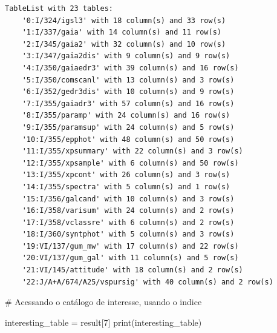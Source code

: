 \documentclass[
  letterpaper,
  DIV=11,
  numbers=noendperiod]{scrreprt}
\newenvironment{Shaded}{\begin{snugshade}}{\end{snugshade}}
\newcommand{\BuiltInTok}[1]{\textcolor[rgb]{0.00,0.23,0.31}{#1}}
\newcommand{\CommentTok}[1]{\textcolor[rgb]{0.37,0.37,0.37}{#1}}
\newcommand{\DecValTok}[1]{\textcolor[rgb]{0.68,0.00,0.00}{#1}}
\newcommand{\NormalTok}[1]{\textcolor[rgb]{0.00,0.23,0.31}{#1}}
\newcommand{\OperatorTok}[1]{\textcolor[rgb]{0.37,0.37,0.37}{#1}}
\begin{document}
\begin{verbatim}
TableList with 23 tables:
    '0:I/324/igsl3' with 18 column(s) and 33 row(s) 
    '1:I/337/gaia' with 14 column(s) and 11 row(s) 
    '2:I/345/gaia2' with 32 column(s) and 10 row(s) 
    '3:I/347/gaia2dis' with 9 column(s) and 9 row(s) 
    '4:I/350/gaiaedr3' with 39 column(s) and 16 row(s) 
    '5:I/350/comscanl' with 13 column(s) and 3 row(s) 
    '6:I/352/gedr3dis' with 10 column(s) and 9 row(s) 
    '7:I/355/gaiadr3' with 57 column(s) and 16 row(s) 
    '8:I/355/paramp' with 24 column(s) and 16 row(s) 
    '9:I/355/paramsup' with 24 column(s) and 5 row(s) 
    '10:I/355/epphot' with 48 column(s) and 50 row(s) 
    '11:I/355/xpsummary' with 22 column(s) and 3 row(s) 
    '12:I/355/xpsample' with 6 column(s) and 50 row(s) 
    '13:I/355/xpcont' with 26 column(s) and 3 row(s) 
    '14:I/355/spectra' with 5 column(s) and 1 row(s) 
    '15:I/356/galcand' with 10 column(s) and 3 row(s) 
    '16:I/358/varisum' with 24 column(s) and 2 row(s) 
    '17:I/358/vclassre' with 6 column(s) and 2 row(s) 
    '18:I/360/syntphot' with 5 column(s) and 3 row(s) 
    '19:VI/137/gum_mw' with 17 column(s) and 22 row(s) 
    '20:VI/137/gum_gal' with 11 column(s) and 5 row(s) 
    '21:VI/145/attitude' with 18 column(s) and 2 row(s) 
    '22:J/A+A/674/A25/vspursig' with 40 column(s) and 2 row(s) 
\end{verbatim}

\begin{Shaded}
\begin{Highlighting}[]
\CommentTok{\# Acessando o catálogo de interesse, usando o indice}

\NormalTok{interesting\_table }\OperatorTok{=}\NormalTok{ result[}\DecValTok{7}\NormalTok{]}
\BuiltInTok{print}\NormalTok{(interesting\_table)}
\end{Highlighting}
\end{Shaded}
\end{document}
